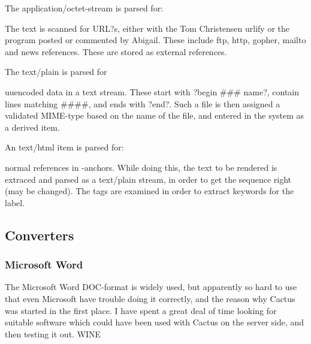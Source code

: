 The application/octet-stream is parsed for:

The text is scanned for URL?s, either with the Tom
Christensen urlify or the program posted or commented by
Abigail.  These include ftp, http, gopher, mailto and news
references.  These are stored as external references.

The text/plain is parsed for

uuencoded data in a text stream.  These start with ?begin
\#\#\# name?, contain lines matching \#\#\#\#, and ends with
?end?.  Such a file is then assigned a validated MIME-type
based on the name of the file, and entered in the system as
a derived item.

An text/html item is parsed for:

normal references in -anchors.  While doing this, the
text to be rendered is extraced and parsed as a text/plain
stream, in order to get the sequence right (may be changed).
The  tags are examined in order to extract
keywords for the label.



\subsection{Converters}
\label{sec:converters}


\subsubsection{Microsoft Word}

The Microsoft Word DOC-format is widely used, but apparently
so hard to use that even Microsoft have trouble doing it
correctly, and the reason why Cactus was started in the
first place.  I have spent a great deal of time looking for
suitable software which could have been used with Cactus on
the server side, and then testing it out.  \textsf{WINE}

